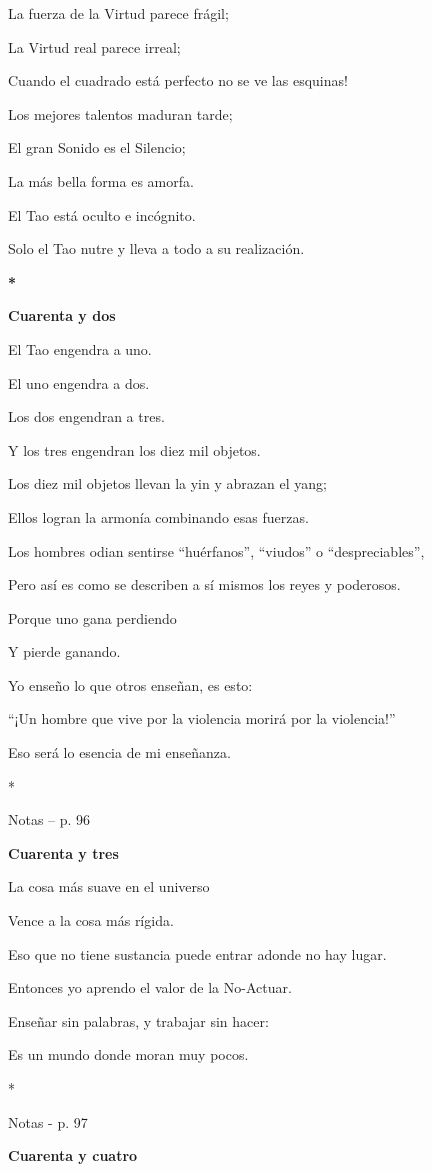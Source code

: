 La fuerza de la Virtud parece frágil;

La Virtud real parece irreal;

Cuando el cuadrado está perfecto no se ve las esquinas!

Los mejores talentos maduran tarde;

El gran Sonido es el Silencio;

La más bella forma es amorfa.

El Tao está oculto e incógnito.

Solo el Tao nutre y lleva a todo a su realización.

\textbf{*}

\textbf{Cuarenta y dos}

El Tao engendra a uno.

El uno engendra a dos.

Los dos engendran a tres.

Y los tres engendran los diez mil objetos.

Los diez mil objetos llevan la yin y abrazan el yang;

Ellos logran la armonía combinando esas fuerzas.

Los hombres odian sentirse ``huérfanos'', ``viudos'' o
``despreciables'',

Pero así es como se describen a sí mismos los reyes y poderosos.

Porque uno gana perdiendo

Y pierde ganando.

Yo enseño lo que otros enseñan, es esto:

``¡Un hombre que vive por la violencia morirá por la violencia!''

Eso será lo esencia de mi enseñanza.

*

Notas -- p. 96

\textbf{Cuarenta y tres}

La cosa más suave en el universo

Vence a la cosa más rígida.

Eso que no tiene sustancia puede entrar adonde no hay lugar.

Entonces yo aprendo el valor de la No-Actuar.

Enseñar sin palabras, y trabajar sin hacer:

Es un mundo donde moran muy pocos.

*

Notas - p. 97

\textbf{Cuarenta y cuatro}


